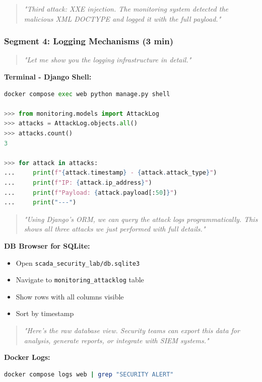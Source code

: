 \documentclass[12pt,a4paper]{article}
\begin{document}
\begin{quote}
\textit{"Third attack: XXE injection. The monitoring system detected the malicious XML DOCTYPE and logged it with the full payload."}
\end{quote}

\subsubsection{Segment 4: Logging Mechanisms (3 min)}

\begin{quote}
\textit{"Let me show you the logging infrastructure in detail."}
\end{quote}

\textbf{Terminal - Django Shell:}
\begin{lstlisting}[language=Python]
docker compose exec web python manage.py shell

>>> from monitoring.models import AttackLog
>>> attacks = AttackLog.objects.all()
>>> attacks.count()
3

>>> for attack in attacks:
...     print(f"{attack.timestamp} - {attack.attack_type}")
...     print(f"IP: {attack.ip_address}")
...     print(f"Payload: {attack.payload[:50]}")
...     print("---")
\end{lstlisting}

\begin{quote}
\textit{"Using Django's ORM, we can query the attack logs programmatically. This shows all three attacks we just performed with full details."}
\end{quote}

\textbf{DB Browser for SQLite:}
\begin{itemize}
    \item Open \texttt{scada\_security\_lab/db.sqlite3}
    \item Navigate to \texttt{monitoring\_attacklog} table
    \item Show rows with all columns visible
    \item Sort by timestamp
\end{itemize}

\begin{quote}
\textit{"Here's the raw database view. Security teams can export this data for analysis, generate reports, or integrate with SIEM systems."}
\end{quote}

\textbf{Docker Logs:}
\begin{lstlisting}[language=bash]
docker compose logs web | grep "SECURITY ALERT"
\end{lstlisting}
\end{document}
